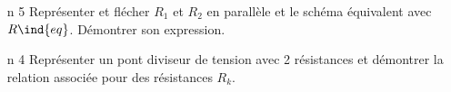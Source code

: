 \documentclass[a4paper, 10pt, final, garamond]{book}
\begin{document}
\begin{enumerate}[label=\sqenumi, leftmargin=10pt]
\begin{isd}[lefthand ratio=.3]
\begin{center}
    \end{center}
    \vspace{-15pt}
    \tcblower
    \vspace{-15pt}
    \vspace{-15pt}
  \end{isd}
  \item[n]{5} %
  Représenter et flécher $R_1$ et $R_2$ en parallèle et le schéma équivalent
  avec $R\ind{eq}$. Démontrer son expression.
  \smallbreak
  \begin{isd}[lefthand ratio=.3]
    \vspace{-15pt}
    \begin{center}
    \end{center}
    \vspace{-15pt}
    \tcblower
    \vspace{-15pt}
    \vspace{-15pt}
  \end{isd}
  \item[n]{4} %
  Représenter un pont diviseur de tension avec 2 résistances et démontrer la
  relation associée pour des résistances $R_k$.
  \smallbreak
  \begin{isd}[lefthand ratio=.30]
    \vspace{-15pt}
    \begin{center}

\end{center}
\end{isd}
\end{enumerate}
\end{document}
